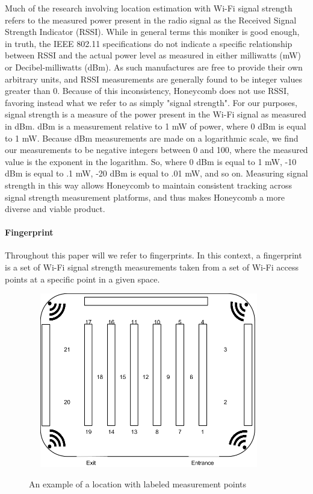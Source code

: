 Much of the research involving location estimation with Wi-Fi signal strength refers to the measured power present in the radio signal as the Received Signal Strength Indicator (RSSI). While in general terms this moniker is good enough, in truth, the IEEE 802.11 specifications \cite{ieee802.11} do not indicate a specific relationship between RSSI and the actual power level as measured in either milliwatts (mW) or Decibel-milliwatts (dBm). As such manufactures are free to provide their own arbitrary units, and RSSI measurements are generally found to be integer values greater than 0. Because of this inconsistency, Honeycomb does not use RSSI, favoring instead what we refer to as simply "signal strength". For our purposes, signal strength is a measure of the power present in the Wi-Fi signal as measured in dBm. dBm is a measurement relative to 1 mW of power, where 0 dBm is equal to 1 mW. Because dBm measurements are made on a logarithmic scale, we find our measurements to be negative integers between 0 and 100, where the measured value is the exponent in the logarithm. So, where 0 dBm is equal to 1 mW, -10 dBm is equal to .1 mW, -20 dBm is equal to .01 mW, and so on. Measuring signal strength in this way allows Honeycomb to maintain consistent tracking across signal strength measurement platforms, and thus makes Honeycomb a more diverse and viable product.


\paragraph{Fingerprint}
Throughout this paper will we refer to fingerprints. In this context, a fingerprint is a set of Wi-Fi signal strength measurements taken from a set of Wi-Fi access points at a specific point in a given space. 

\begin{figure}[htb] %
	\begin{center}
		\ \includegraphics[width=4in,height=3in]{ExampleLocation.png}
		\caption{An example of a location with labeled measurement points}
		\label{storeexample}
	\end{center}
\end{figure}


